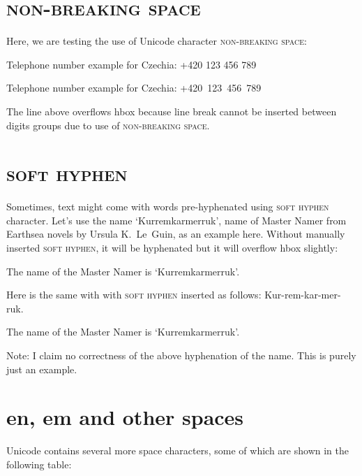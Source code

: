 \documentclass{article}
\DeclareRobustCommand{\expl}[1]{{\sffamily #1}}
\newcommand{\nbsp}{\textsc{non-breaking space}}
\newcommand{\shy}{\textsc{soft hyphen}}
\begin{document}
\pagebreak

\section{\nbsp{}}

\expl{Here, we are testing the use of Unicode character \nbsp{}:}

Telephone number example for Czechia: +420 123 456 789

Telephone number example for Czechia: +420 123 456 789

\expl{The line above overflows hbox because line break cannot be inserted
  between digits groups due to use of \nbsp{}.}

\pagebreak

\section{\shy{}}
\expl{Sometimes, text might come with words pre-​hyphenated using \shy{}
  character. Let's use the name `Kurremkarmerruk', name of Master Namer from
  Earthsea novels by Ursula K.\ Le~Guin, as an example here. Without manually
  inserted \shy{}, it will be hyphenated but it will overflow hbox slightly:}

The name of the Master Namer is `Kurremkarmerruk'.

\expl{Here is the same with with \shy{} inserted as follows:
  Kur-rem-kar-mer-ruk.}

The name of the Master Namer is `Kur­rem­kar­mer­ruk'.

\expl{Note: I claim no correctness of the above hyphenation of the name. This
  is purely just an example.}

\pagebreak

\section{en, em and other spaces}

\expl{Unicode contains several more space characters, some of which are shown in
the following table:}
\end{document}
